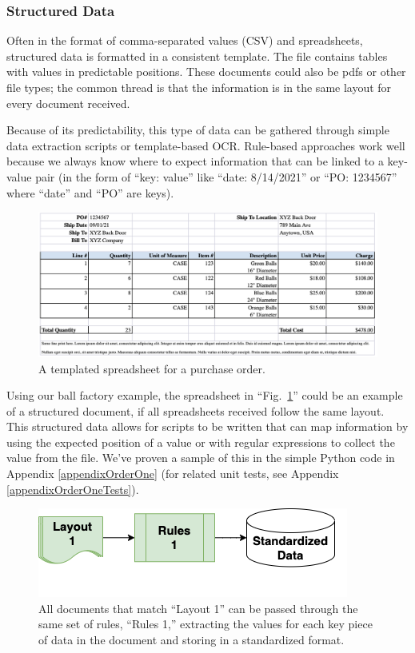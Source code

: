 \documentclass[conference, draftcls]{IEEEtran}
\begin{document}
\subsubsection{Structured Data}
Often in the format of comma-separated values (CSV) and spreadsheets, structured data is formatted in a consistent template. The file contains tables with values in predictable positions. These documents could also be pdfs or other file types; the common thread is that the information is in the same layout for every document received.

Because of its predictability, this type of data can be gathered through simple data extraction scripts or template-based OCR. Rule-based approaches work well because we always know where to expect information that can be linked to a key-value pair (in the form of ``key: value'' like ``date: 8/14/2021'' or ``PO: 1234567'' where ``date'' and ``PO'' are keys).

\begin{figure}[ht]
\centerline{\includegraphics[width=\columnwidth]{Spreadsheet1.png}}
\caption{A templated spreadsheet for a purchase order.}
\label{figSpreadsheet1}
\end{figure}

Using our ball factory example, the spreadsheet in ``Fig.~\ref{figSpreadsheet1}'' could be an example of a structured document, if all spreadsheets received follow the same layout. This structured data allows for scripts to be written that can map information by using the expected position of a value or with regular expressions to collect the value from the file. We've proven a sample of this in the simple Python code in Appendix \ref{appendixOrderOne} (for related unit tests, see Appendix \ref{appendixOrderOneTests}).

\begin{figure}[ht]
\centerline{\includegraphics[width=\columnwidth]{RulesFlow1.png}}
\caption{All documents that match ``Layout 1'' can be passed through the same set of rules, ``Rules 1,'' extracting the values for each key piece of data in the document and storing in a standardized format.}
\label{figRulesFlow1}
\end{figure}
\end{document}
